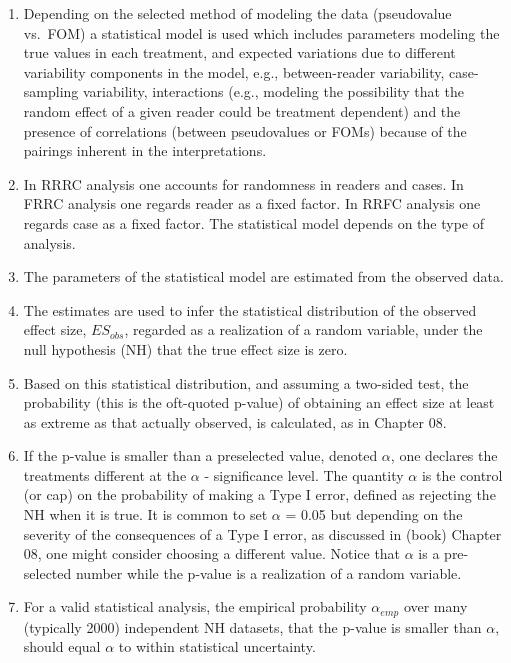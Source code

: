 \documentclass[
]{book}
\providecommand{\tightlist}{%
  \setlength{\itemsep}{0pt}\setlength{\parskip}{0pt}}
\begin{document}
\begin{enumerate}
\def\labelenumi{\arabic{enumi}.}
\tightlist
\item
  Depending on the selected method of modeling the data (pseudovalue vs.~FOM) a statistical model is used which includes parameters modeling the true values in each treatment, and expected variations due to different variability components in the model, e.g., between-reader variability, case-sampling variability, interactions (e.g., modeling the possibility that the random effect of a given reader could be treatment dependent) and the presence of correlations (between pseudovalues or FOMs) because of the pairings inherent in the interpretations.
\item
  In RRRC analysis one accounts for randomness in readers and cases. In FRRC analysis one regards reader as a fixed factor. In RRFC analysis one regards case as a fixed factor. The statistical model depends on the type of analysis.
\item
  The parameters of the statistical model are estimated from the observed data.
\item
  The estimates are used to infer the statistical distribution of the observed effect size, \(ES_{obs}\), regarded as a realization of a random variable, under the null hypothesis (NH) that the true effect size is zero.
\item
  Based on this statistical distribution, and assuming a two-sided test, the probability (this is the oft-quoted p-value) of obtaining an effect size at least as extreme as that actually observed, is calculated, as in Chapter 08.
\item
  If the p-value is smaller than a preselected value, denoted \(\alpha\), one declares the treatments different at the \(\alpha\) - significance level. The quantity \(\alpha\) is the control (or cap) on the probability of making a Type I error, defined as rejecting the NH when it is true. It is common to set \(\alpha\) = 0.05 but depending on the severity of the consequences of a Type I error, as discussed in (book) Chapter 08, one might consider choosing a different value. Notice that \(\alpha\) is a pre-selected number while the p-value is a realization of a random variable.
\item
  For a valid statistical analysis, the empirical probability \(\alpha_{emp}\) over many (typically 2000) independent NH datasets, that the p-value is smaller than \(\alpha\), should equal \(\alpha\) to within statistical uncertainty.
\end{enumerate}
\end{document}
